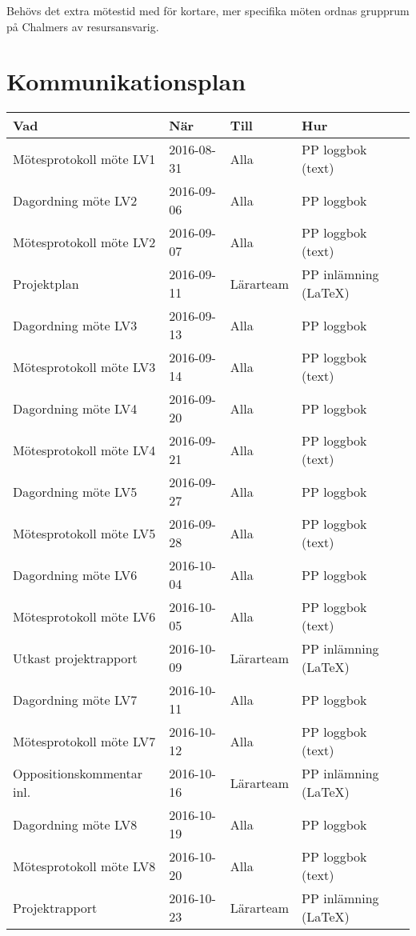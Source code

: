 \documentclass[a4paper]{article}
\begin{document}
\vspace{5mm}
\noindent Behövs det extra mötestid med för kortare, mer specifika möten ordnas grupprum på Chalmers av resursansvarig.



\section{Kommunikationsplan}

\begin{tabular}{|l|l|l|l|} \hline
\bf Vad                  & \bf När    & \bf Till & \bf Hur               \\ \hline \hline
Mötesprotokoll möte LV1  & 2016-08-31 & Alla      & PP loggbok   (text)  \\ \hline
Dagordning möte LV2      & 2016-09-06 & Alla      & PP loggbok           \\ \hline
Mötesprotokoll möte LV2  & 2016-09-07 & Alla      & PP loggbok   (text)  \\ \hline
Projektplan              & 2016-09-11 & Lärarteam & PP inlämning (LaTeX) \\ \hline
Dagordning möte LV3      & 2016-09-13 & Alla      & PP loggbok           \\ \hline
Mötesprotokoll möte LV3  & 2016-09-14 & Alla      & PP loggbok   (text)  \\ \hline
Dagordning möte LV4      & 2016-09-20 & Alla      & PP loggbok           \\ \hline
Mötesprotokoll möte LV4  & 2016-09-21 & Alla      & PP loggbok   (text)  \\ \hline
Dagordning möte LV5      & 2016-09-27 & Alla      & PP loggbok           \\ \hline
Mötesprotokoll möte LV5  & 2016-09-28 & Alla      & PP loggbok   (text)  \\ \hline
Dagordning möte LV6      & 2016-10-04 & Alla      & PP loggbok           \\ \hline
Mötesprotokoll möte LV6  & 2016-10-05 & Alla      & PP loggbok   (text)  \\ \hline
Utkast projektrapport    & 2016-10-09 & Lärarteam & PP inlämning (LaTeX) \\ \hline
Dagordning möte LV7      & 2016-10-11 & Alla      & PP loggbok           \\ \hline
Mötesprotokoll möte LV7  & 2016-10-12 & Alla      & PP loggbok   (text)  \\ \hline
Oppositionskommentar inl.& 2016-10-16 & Lärarteam & PP inlämning (LaTeX) \\ \hline
Dagordning möte LV8      & 2016-10-19 & Alla      & PP loggbok           \\ \hline
Mötesprotokoll möte LV8  & 2016-10-20 & Alla      & PP loggbok   (text)  \\ \hline
Projektrapport           & 2016-10-23 & Lärarteam & PP inlämning (LaTeX) \\ \hline

\end{tabular}
\end{document}
